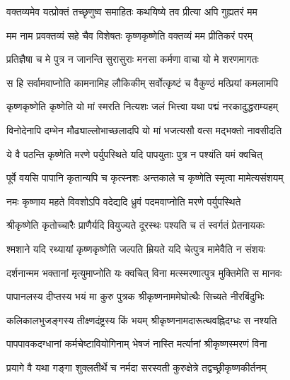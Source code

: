 

\addtocounter{shlokacount}{31}


\twolineshloka
{वक्तव्यमेव यत्प्रोक्तं तच्छृणुष्व समाहितः}
{कथयिष्ये तव प्रीत्या अपि गुह्यतरं मम} %

\twolineshloka
{मम नाम प्रवक्तव्यं सहे चैव विशेषतः}
{कृष्णकृष्णेति वक्तव्यं मम प्रीतिकरं परम्} %

\twolineshloka
{प्रतिज्ञैषा च मे पुत्र न जानन्ति सुरासुराः}
{मनसा कर्मणा वाचा यो मे शरणमागतः} %

\twolineshloka
{स हि सर्वामवाप्नोति कामनामिह लौकिकीम्}
{सर्वोत्कृष्टं च वैकुण्ठं मत्प्रियां कमलामपि} %

\twolineshloka
{कृष्णकृष्णेति कृष्णेति यो मां स्मरति नित्यशः}
{जलं भित्त्वा यथा पद्मं नरकादुद्धराम्यहम्} %

\twolineshloka
{विनोदेनापि दम्भेन मौढ्याल्लोभाच्छलादपि}
{यो मां भजत्यसौ वत्स मद्भक्तो नावसीदति} %

\twolineshloka
{ये वै पठन्ति कृष्णेति मरणे पर्युपस्थिते}
{यदि पापयुताः पुत्र न पश्यंति यमं क्वचित्} %

\twolineshloka
{पूर्वे वयसि पापानि कृतान्यपि च कृत्स्नशः}
{अन्तकाले च कृष्णेति स्मृत्वा मामेत्यसंशयम्} %

\twolineshloka
{नमः कृष्णाय महते विवशोऽपि वदेद्यदि}
{ध्रुवं पदमवाप्नोति मरणे पर्युपस्थिते} %

\twolineshloka
{श्रीकृष्णेति कृतोच्चारैः प्राणैर्यदि वियुज्यते}
{दूरस्थः पश्यति च तं स्वर्गतं प्रेतनायकः} %

\twolineshloka
{श्मशाने यदि रथ्यायां कृष्णकृष्णेति जल्पति}
{म्रियते यदि चेत्पुत्र मामेवैति न संशयः} %

\twolineshloka
{दर्शनान्मम भक्तानां मृत्युमाप्नोति यः क्वचित्}
{विना मत्स्मरणात्पुत्र मुक्तिमेति स मानवः} %

\twolineshloka
{पापानलस्य दीप्तस्य भयं मा कुरु पुत्रक}
{श्रीकृष्णनाममेघोत्थैः सिच्यते नीरबिंदुभिः} %

\twolineshloka
{कलिकालभुजङ्गस्य तीक्ष्णदंष्ट्रस्य किं भयम्}
{श्रीकृष्णनामदारूत्थवह्निदग्धः स नश्यति} %

\twolineshloka
{पापपावकदग्धानां कर्मचेष्टावियोगिनाम्}
{भेषजं नास्ति मर्त्यानां श्रीकृष्णस्मरणं विना} %

\twolineshloka
{प्रयागे वै यथा गङ्गा शुक्लतीर्थे च नर्मदा}
{सरस्वती कुरुक्षेत्रे तद्वच्छ्रीकृष्णकीर्तनम्} %

